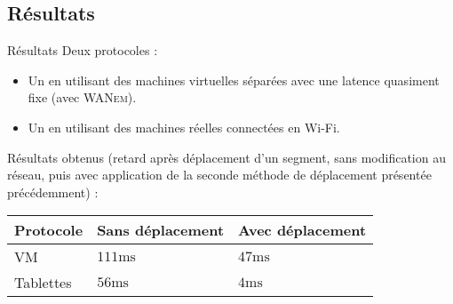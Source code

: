\subsection{Résultats}
\begin{frame}{Résultats}
	Deux protocoles : 
	
	\begin{itemize}
		\item Un en utilisant des machines virtuelles séparées avec une latence quasiment fixe (avec \textsc{WANem}).
		\item Un en utilisant des machines réelles connectées en Wi-Fi.
	\end{itemize}
	
	Résultats obtenus (retard après déplacement d'un segment, sans modification au réseau, puis avec application de la seconde méthode de déplacement présentée précédemment) :

\begin{table}[H]
	\centering
	\tabulinesep=3pt
	\begin{tabu} to \linewidth {XXX}
		Protocole & Sans déplacement & Avec déplacement \\
		\toprule[0.15em]
		VM & $\num{111}\si{\milli\second}$ & $\num{47}\si{\milli\second}$ \\
		Tablettes & $\num{56}\si{\milli\second}$ & $\num{4}\si{\milli\second}$ \\
	\end{tabu}
\end{table}

\end{frame}

